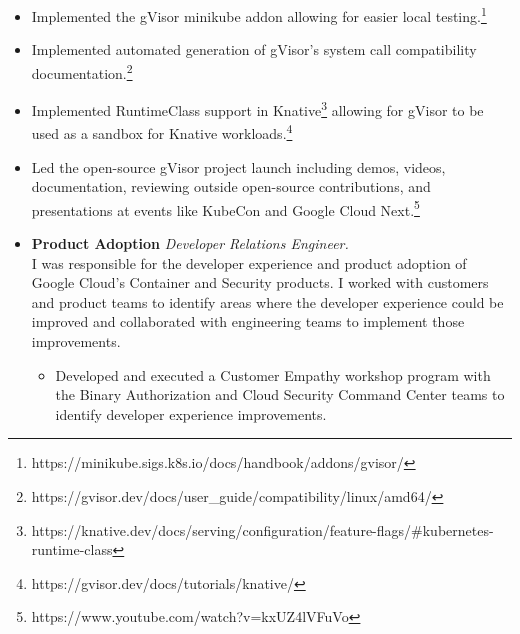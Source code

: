 \documentclass{article}
\begin{document}
\begin{list}{}{
    \setlength{\leftmargin}{0cm}	%
    \setlength{\parsep}{0.15cm}
}
\begin{itemize}
\begin{itemize}
            \item Implemented the gVisor minikube addon allowing for easier
                local
                testing.\footnote{https://minikube.sigs.k8s.io/docs/handbook/addons/gvisor/}

            \item Implemented automated generation of gVisor's system call
                compatibility
                documentation.\footnote{https://gvisor.dev/docs/user\_guide/compatibility/linux/amd64/}

            \item Implemented RuntimeClass support in
                Knative\footnote{https://knative.dev/docs/serving/configuration/feature-flags/\#kubernetes-runtime-class}
                allowing for gVisor to be used as a sandbox for Knative
                workloads.\footnote{https://gvisor.dev/docs/tutorials/knative/}

            \item Led the open-source gVisor project launch including demos,
                videos, documentation, reviewing outside open-source
                contributions, and presentations at events like KubeCon and
                Google Cloud
                Next.\footnote{https://www.youtube.com/watch?v=kxUZ4lVFuVo}

        \end{itemize}

    \end{itemize}

    \begin{itemize}

        \item \textbf{Product Adoption} \emph{Developer Relations Engineer.}\\
            I was responsible for the developer experience and product adoption
            of Google Cloud's Container and Security products. I worked with
            customers and product teams to identify areas where the developer
            experience could be improved and collaborated with engineering teams
            to implement those improvements.

        \begin{itemize}

            \item Developed and executed a Customer Empathy workshop program
                with the Binary Authorization and Cloud Security Command Center
                teams to identify developer experience improvements.


\end{itemize}
\end{itemize}
\end{list}
\end{document}
